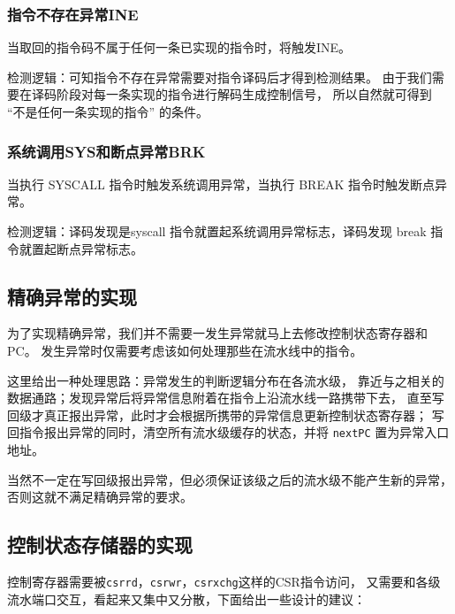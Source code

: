 \subsubsection{指令不存在异常INE}

当取回的指令码不属于任何一条已实现的指令时，将触发INE。

检测逻辑：可知指令不存在异常需要对指令译码后才得到检测结果。
由于我们需要在译码阶段对每一条实现的指令进行解码生成控制信号，
所以自然就可得到 ``不是任何一条实现的指令'' 的条件。

\subsubsection{系统调用SYS和断点异常BRK}

当执行 SYSCALL 指令时触发系统调用异常，当执行 BREAK 指令时触发断点异常。

检测逻辑：译码发现是syscall 指令就置起系统调用异常标志，译码发现 break 指令就置起断点异常标志。

\subsection{精确异常的实现}

为了实现精确异常，我们并不需要一发生异常就马上去修改控制状态寄存器和PC。
发生异常时仅需要考虑该如何处理那些在流水线中的指令。

这里给出一种处理思路：异常发生的判断逻辑分布在各流水级，
靠近与之相关的数据通路；发现异常后将异常信息附着在指令上沿流水线一路携带下去，
直至写回级才真正报出异常，此时才会根据所携带的异常信息更新控制状态寄存器；
写回指令报出异常的同时，清空所有流水级缓存的状态，并将 \texttt{nextPC} 置为异常入口地址。

当然不一定在写回级报出异常，但必须保证该级之后的流水级不能产生新的异常，否则这就不满足精确异常的要求。

\subsection{控制状态存储器的实现}

控制寄存器需要被\texttt{csrrd}，\texttt{csrwr}，\texttt{csrxchg}这样的CSR指令访问，
又需要和各级流水端口交互，看起来又集中又分散，下面给出一些设计的建议：

